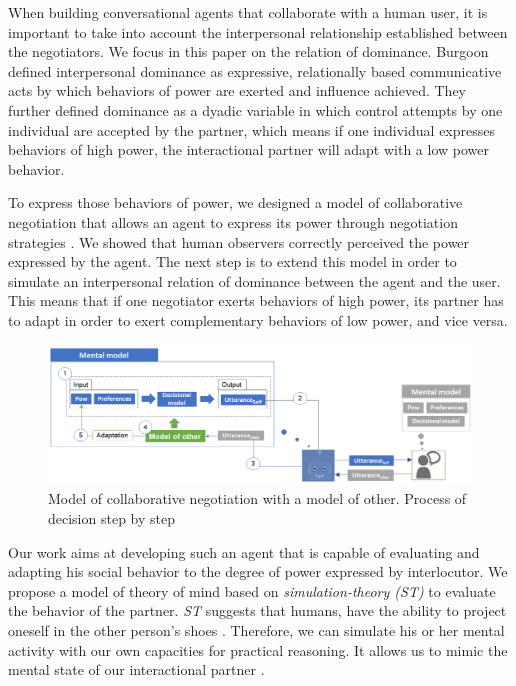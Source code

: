 \documentclass[conference, letterpaper]{IEEEtran}
\begin{document}
		When building conversational agents that collaborate with a human user, it is important to take into account the interpersonal relationship established between the negotiators.
		 We focus in this paper on the relation of dominance. Burgoon \cite{burgoon1998nature} defined interpersonal dominance as expressive, relationally based communicative acts by which behaviors of power are exerted and influence achieved. They further defined dominance as a dyadic variable in which control attempts by one individual are accepted by the partner, which means if one individual expresses behaviors of high power, the interactional partner will adapt with a low power behavior. 
	
		To express those behaviors of power, we designed a model of collaborative negotiation that allows an agent to express its power through negotiation strategies \cite{ouali2017computational}. We showed that human observers correctly perceived the power expressed by the agent.
		The next step is to extend this model in order to simulate an interpersonal relation of dominance between the agent and the user. This means that if one negotiator exerts behaviors of high power, its partner has to adapt in order to exert complementary behaviors of low power, and vice versa.
		
		\begin{figure}[h]
			\centering
			\includegraphics[width=0.8\linewidth]{figs/model/general.png}
			\caption{Model of collaborative negotiation with a model of other. Process of decision step by step} 
			\label{fig:schema-general}
		\end{figure} 

	
		Our work aims at developing such an agent that is capable of evaluating and adapting his social behavior to the degree of power expressed by interlocutor. We propose a model of theory of mind based on \emph{simulation-theory (ST)} \cite{gordon1986folk} to evaluate the behavior of the partner. \emph{ST} suggests that humans, have the ability to project oneself in the other person’s shoes \cite{shanton2010simulation}. Therefore, we can simulate his or her mental activity with our own capacities for practical reasoning. It allows us to mimic the mental state of our interactional partner \cite{harbers2009modeling}.%
		  
\end{document}

